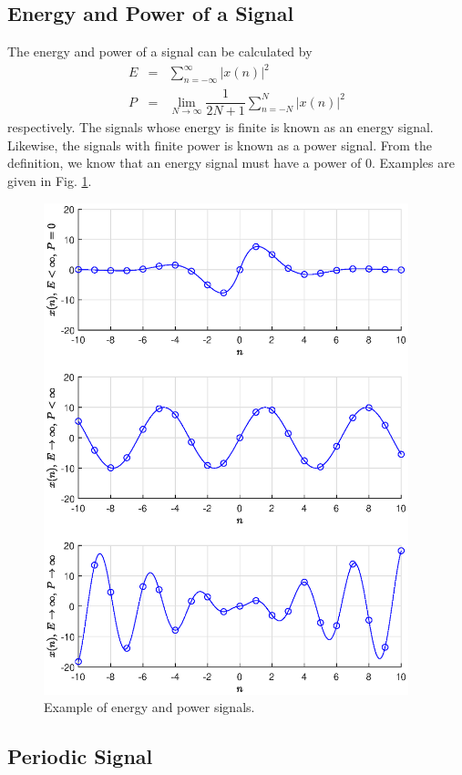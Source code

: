 \subsection{Energy and Power of a Signal}

The energy and power of a signal can be calculated by
\begin{eqnarray}
	E &=& \sum_{n=-\infty}^{\infty} |x(n)|^2 \nonumber \\
	P &=& \lim_{N\rightarrow\infty} \dfrac{1}{2N+1}\sum_{n=-N}^{N}|x(n)|^2 \nonumber
\end{eqnarray}
respectively. The signals whose energy is finite is known as an energy signal. Likewise, the signals with finite power is known as a power signal. From the definition, we know that an energy signal must have a power of $0$. Examples are given in Fig. \ref{fig:energypowersignal}.
\begin{figure}
	\centering
	\includegraphics[width=300pt]{chapters/ch-signal-processing/figures/energypowersignal.eps}
	\caption{Example of energy and power signals.} \label{fig:energypowersignal}
\end{figure}

\subsection{Periodic Signal}

